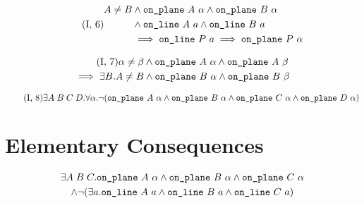 \begin{equation}\label{eq:g16}
  \tag{I, 6}
  \begin{split}
    A \neq B &\wedge \code{on\_plane}\ A\ \alpha \wedge \code{on\_plane}\ B\ \alpha\\
    &\wedge \code{on\_line}\ A\ a \wedge \code{on\_line}\ B\ a\\
    &\implies \code{on\_line}\ P\ a \implies \code{on\_plane}\ P\ \alpha
  \end{split}
\end{equation}

\begin{multline}
\label{eq:g17}
  \tag{I, 7}
   \alpha \neq \beta \wedge \texttt{on\_plane}\ A\ \alpha \wedge \texttt{on\_plane}\ A\ \beta\\
   \implies \exists B. A \neq B \wedge \texttt{on\_plane}\ B\ \alpha \wedge \texttt{on\_plane}\ B\ \beta
\end{multline}

\begin{equation}
\label{eq:g18}
  \tag{I, 8}
  \exists A\;B\;C\;D. \forall \alpha. \neg(\texttt{on\_plane}\ A\ \alpha \wedge \texttt{on\_plane}\ B\ \alpha \wedge \texttt{on\_plane}\ C\ \alpha \wedge \texttt{on\_plane}\ D\ \alpha)
\end{equation}

\section{Elementary Consequences}
\begin{multline}\label{eq:PlaneThree}
  \exists A\;B\;C. \code{on\_plane}\ A\ \alpha\wedge\code{on\_plane}\ B\ \alpha\wedge\code{on\_plane}\ C\ \alpha\\
  \wedge \Triangle{a}{A}{B}{C}
\end{multline}

